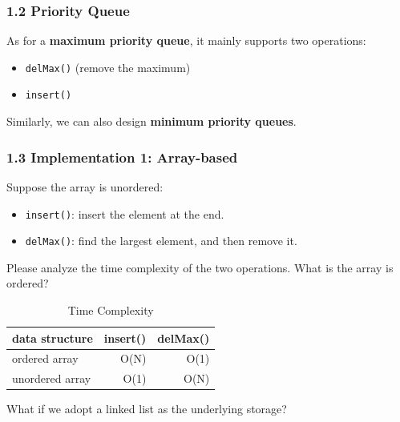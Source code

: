 \documentclass[aspectratio=169, 14pt]{beamer}
\begin{document}
\begin{frame}[fragile]
    \frametitle{1.2 Priority Queue}
As for a \textbf{maximum priority queue}, it mainly supports two operations:

\begin{itemize}
    \item \texttt{delMax()} (remove the maximum)
    \item \texttt{insert()}
\end{itemize}


Similarly, we can also design \textbf{minimum priority queues}.
\end{frame}

\begin{frame}
    \frametitle{1.3 Implementation 1: Array-based}
Suppose the array is unordered:

\begin{itemize}
    \item \texttt{insert()}: insert the element at the end.
    \item \texttt{delMax()}: find the largest element, and then remove it.
\end{itemize}

 Please analyze the time complexity of the two operations. What is the array is ordered?

\end{frame}

\begin{frame}
    
    \begin{table}
        \caption{Time Complexity}
        \begin{tabular}{lrr}
          \toprule
          data structure & insert() & delMax() \\
          \midrule
          ordered array & O(N) & O(1) \\
          unordered array & O(1) & O(N) \\
          \bottomrule
        \end{tabular}
    \end{table}

 What if we adopt a linked list as the underlying storage?
\end{frame}
\end{document}
